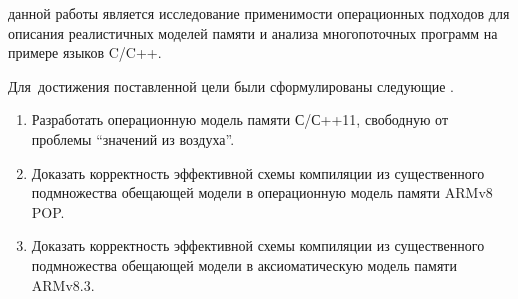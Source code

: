 



{\aim} данной работы является исследование применимости операционных
подходов для описания реалистичных моделей памяти и анализа
многопоточных программ на примере языков C/C++.

Для~достижения поставленной цели были сформулированы следующие {\tasks}.
\begin{enumerate}
  \item Разработать операционную модель памяти С/С++11, свободную от проблемы ``значений из воздуха''.
  \item Доказать корректность эффективной схемы компиляции из существенного подмножества обещающей модели в операционную модель памяти ARMv8 POP.
  \item Доказать корректность эффективной схемы компиляции из существенного подмножества обещающей модели в аксиоматическую модель памяти ARMv8.3.
\end{enumerate}

